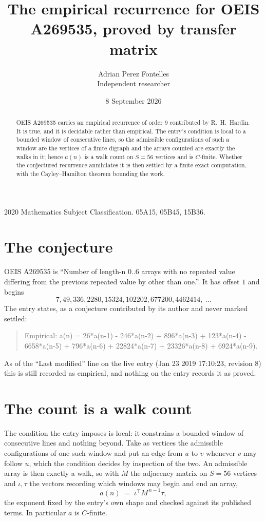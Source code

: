 \documentclass[11pt,a4paper]{article}
\title{The empirical recurrence for OEIS A269535, proved by transfer matrix}
\author{Adrian Perez Fontelles\\ \small Independent researcher}
\date{8 September 2026}
\theoremstyle{plain}
\theoremstyle{definition}
\begin{document}
\maketitle

\begin{abstract}
OEIS A269535 carries an empirical recurrence of order $9$ contributed by R.~H.~Hardin. It is
true, and it is decidable rather than empirical. The entry's condition is local to a bounded window of consecutive lines, so
the admissible configurations of such a window are the vertices of a finite digraph and the
arrays counted are exactly the walks in it; hence $a(n)$ is a walk count on $S=56$ vertices
and is $C$-finite. Whether the conjectured recurrence annihilates it is then settled by a
finite exact computation, with the Cayley--Hamilton theorem bounding the work.
\end{abstract}

\noindent\small 2020 Mathematics Subject Classification. 05A15, 05B45, 15B36.\normalsize

\section{The conjecture}

OEIS A269535 is ``Number of length-n 0..6 arrays with no repeated value differing from the previous repeated value by other than one.''. It has offset $1$ and begins
\[
7, 49, 336, 2280, 15324, 102202, 677200, 4462414,\ \dots
\]
The entry states, as a conjecture contributed by its author and never marked settled:
\begin{quote}
Empirical: a(n) = 26*a(n-1) - 246*a(n-2) + 896*a(n-3) + 123*a(n-4) - 6658*a(n-5) + 796*a(n-6) + 22824*a(n-7) + 23326*a(n-8) + 6924*a(n-9).
\end{quote}
As of the ``Last modified'' line on the live entry (Jan 23 2019 17:10:23, revision 8) this is still
recorded as empirical, and nothing on the entry records it as proved.

\section{The count is a walk count}

The condition the entry imposes is local: it constrains a bounded window of consecutive lines and nothing beyond. Take as
vertices the admissible configurations of one such window and put an edge from $u$ to $v$
whenever $v$ may follow $u$, which the condition decides by inspection of the two. An
admissible array is then exactly a walk, so with $M$ the adjacency matrix on $S=56$ vertices
and $\iota,\tau$ the vectors recording which windows may begin and end an array,
\[
a(n)\;=\;\iota^{\!\top}M^{\,n-1}\tau ,
\]
the exponent fixed by the entry's own shape and checked against its published terms. In
particular $a$ is $C$-finite.
\end{document}
